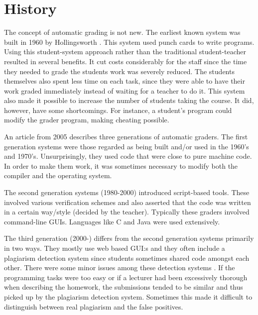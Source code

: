 \section{History}
The concept of automatic grading is not new. The earliest known system was built in 1960 by Hollingsworth \cite{Hollingsworth}. This system used punch cards to write programs. Using this student-system approach rather than the traditional student-teacher resulted in several benefits. It cut costs considerably for the staff since the time they needed to grade the students work was severely reduced. The students themselves also spent less time on each task, since they were able to have their work graded immediately instead of waiting for a teacher to do it. This system also made it possible to increase the number of students taking the course. It did, however, have some shortcomings. For instance, a student’s program could modify the grader program, making cheating possible.

An article from 2005 \cite{GenerationReview} describes three generations of automatic graders. The first generation systems were those regarded as being built and/or used in the 1960’s and 1970’s. Unsurprisingly, they used code that were close to pure machine code. In order to make them work, it was sometimes necessary to modify both the compiler and the operating system.

The second generation systems (1980-2000) introduced script-based tools. These involved various verification schemes and also asserted that the code was written in a certain way/style (decided by the teacher). Typically these graders involved command-line GUIs. Languages like C and Java were used extensively.

The third generation (2000-) differs from the second generation systems primarily in two ways. They mostly use web based GUI:s and they often include a plagiarism detection system since students sometimes shared code amongst each other. There were some minor issues among these detection systems \cite{Gradebot} \cite{GenerationReview}. If the programming tasks were too easy or if a lecturer had been excessively thorough when describing the homework, the submissions tended to be similar and thus picked up by the plagiarism detection system. Sometimes this made it difficult to distinguish between real plagiarism and the false positives.




